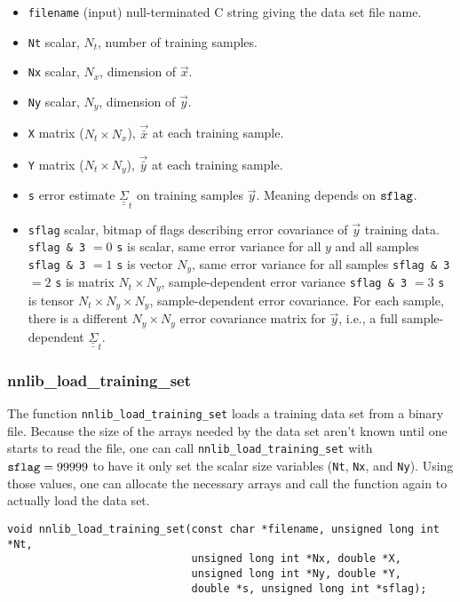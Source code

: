 \documentclass{article}    %
\newcommand{\dbul}[1]{\underline{\underline{#1}}}
\begin{document}
\begin{itemize}
\item \verb|filename| (input) null-terminated C string giving the data set file name.
\item \verb|Nt| scalar, $N_t$, number of training samples.
\item \verb|Nx| scalar, $N_x$, dimension of $\vec{x}$.
\item \verb|Ny| scalar, $N_y$, dimension of $\vec{y}$.
\item \verb|X| matrix ($N_t \times N_x$), $\vec{\bar{x}}$ at each training sample.
\item \verb|Y| matrix ($N_t \times N_y$), $\vec{\bar{y}}$ at each training sample.
\item \verb|s| error estimate $\dbul{\Sigma}_t$ on training samples $\vec{y}$. Meaning depends on $\verb|sflag|$.
\item \verb|sflag| scalar, bitmap of flags describing error covariance of $\vec{y}$ training data.
  \subitem \verb|sflag & 3| $=0$ \verb|s| is scalar, same error variance for all $y$ and all samples
  \subitem \verb|sflag & 3| $=1$ \verb|s| is vector $N_y$, same error variance for all samples
  \subitem \verb|sflag & 3| $=2$ \verb|s| is matrix $N_t \times N_y$, sample-dependent error variance
  \subitem \verb|sflag & 3| $=3$ \verb|s| is tensor $N_t \times N_y
  \times N_y$, sample-dependent error covariance. For each sample,
  there is a different $N_y \times N_y$ error covariance matrix for
  $\vec{y}$, i.e., a full sample-dependent $\dbul{\Sigma}_t$.
\end{itemize}

\subsubsection{nnlib\_load\_training\_set}

The function \verb|nnlib_load_training_set| loads a training data set
from a binary file. Because the size of the arrays needed by the data
set aren't known until one starts to read the file, one can call
\verb|nnlib_load_training_set| with $\verb|sflag|=99999$ to have it
only set the scalar size variables (\verb|Nt|, \verb|Nx|, and
\verb|Ny|).  Using those values, one can allocate the necessary arrays
and call the function again to actually load the data set.

\begin{verbatim}
void nnlib_load_training_set(const char *filename, unsigned long int *Nt, 
                             unsigned long int *Nx, double *X, 
                             unsigned long int *Ny, double *Y, 
                             double *s, unsigned long int *sflag); 
\end{verbatim}
\end{document}
